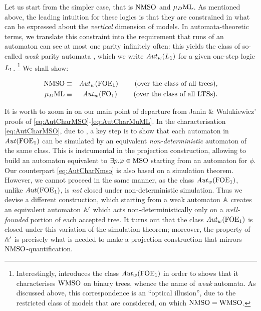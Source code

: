 Let us start from the simpler case, that is $\mathrm{NMSO}$ and $\mu_{D}\mathrm{ML}$.
As mentioned above, the leading intuition for these logics is that they are
constrained in what can be expressed about the \emph{vertical} dimension of 
models. 
In automata-theoretic terms, we translate this constraint into the requirement 
that runs of an automaton can see at most one parity infinitely often: this 
yields the class of so-called \emph{weak} parity 
automata \cite{MullerSaoudiSchupp92}, which we write $\mathit{Aut}_{w}(L_{1})$ for a
given one-step logic $L_{1}$. \footnote{%
    Interestingly, \cite{MullerSaoudiSchupp92} introduces the class
    $\mathit{Aut}_{w}(\mathrm{FOE}_1)$ in order to shows that it characterises $\mathrm{WMSO}$ on binary 
    trees, whence the name of \emph{weak} automata. 
    As discussed above, this correspondence is an ``optical illusion'', due to
    the restricted class of models that are considered, on which $\mathrm{NMSO} = 
    \mathrm{WMSO}$.
    } 
We shall show:
\begin{theorem}
\begin{eqnarray}
\nmso & \equiv & \AutW(\ofoe)
  \qquad \text{ (over the class of all trees)}, \label{eq:AutCharNmso}
\\ \mudML & \equiv & \AutW(\ofo)\label{eq:AutCharMudML}
  \qquad \text{ (over the class of all LTSs)}.
\end{eqnarray}
\end{theorem}
It is worth to zoom in on our main point of departure from Janin \& Walukiewicz' 
proofs of \eqref{eq:AutCharMSO}-\eqref{eq:AutCharMuML}. 
In the characterisation \eqref{eq:AutCharMSO}, due to \cite{Walukiewicz96}, 
a key step is to show that each automaton in $\mathit{Aut}(\mathrm{FOE}_1)$ can be simulated by
an equivalent \emph{non-deterministic} automaton of the same class. 
This is instrumental in the projection construction, allowing to build an
automaton equivalent to $\exists p.\varphi \in \mathrm{MSO}$ starting from an automaton 
for $\phi$. 
Our counterpart \eqref{eq:AutCharNmso} is also based on a simulation theorem. 
However, we cannot proceed in the same manner, as the class $\mathit{Aut}_{w}(\mathrm{FOE}_1)$,
unlike $\mathit{Aut}(\mathrm{FOE}_1)$, is \emph{not} closed under non-deterministic simulation.
Thus we devise a different construction, which starting from a weak automaton 
$\mathbb{A}$ creates an equivalent automaton $\mathbb{A}'$ which acts non-deterministically 
only on a \emph{well-founded} portion of each accepted tree.
It turns out that the class $\mathit{Aut}_{w}(\mathrm{FOE}_1)$ is closed under this variation of 
the simulation theorem; moreover, the property of $\mathbb{A}'$ is precisely what is
needed to make a projection construction that mirrors $\mathrm{NMSO}$-quantification.
\medskip

